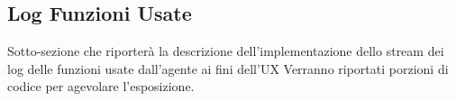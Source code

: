 \subsection{Log Funzioni Usate}

Sotto-sezione che riporterà la descrizione dell'implementazione dello stream dei log delle funzioni usate dall'agente ai fini dell'UX
Verranno riportati porzioni di codice per agevolare l'esposizione.
